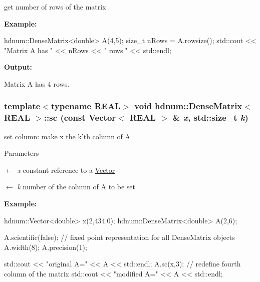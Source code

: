 get number of rows of the matrix 

{\bfseries Example:} 
\begin{DoxyCode}
  hdnum::DenseMatrix<double> A(4,5);
  size_t nRows = A.rowsize();
  std::cout << "Matrix A has " << nRows << " rows." << std::endl;
\end{DoxyCode}


{\bfseries Output:} \begin{DoxyVerb}
Matrix A has 4 rows.
	  \end{DoxyVerb}
 \hypertarget{classhdnum_1_1DenseMatrix_a815aef5dfc09aecd12472dbfd4ab1e37}{
\subsubsection[{sc}]{\setlength{\rightskip}{0pt plus 5cm}template$<$typename REAL$>$ void {\bf hdnum::DenseMatrix}$<$ REAL $>$::sc (const {\bf Vector}$<$ REAL $>$ \& {\em x}, \/  std::size\_\-t {\em k})}}
\label{classhdnum_1_1DenseMatrix_a815aef5dfc09aecd12472dbfd4ab1e37}


set column: make x the k'th column of A 


\begin{DoxyParams}{Parameters}
\item[\mbox{$\leftarrow$} {\em x}]constant reference to a \hyperlink{classhdnum_1_1Vector}{Vector} \item[\mbox{$\leftarrow$} {\em k}]number of the column of A to be set\end{DoxyParams}
{\bfseries Example:} 
\begin{DoxyCode}
  hdnum::Vector<double> x(2,434.0);
  hdnum::DenseMatrix<double> A(2,6);

  A.scientific(false); // fixed point representation for all DenseMatrix objects
  A.width(8);
  A.precision(1);
  
  std::cout << "original A=" << A << std::endl;
  A.sc(x,3);   // redefine fourth column of the matrix
  std::cout << "modified A=" << A << std::endl;
\end{DoxyCode}


